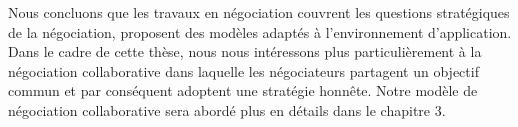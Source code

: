 		  
		Nous concluons que les travaux en négociation couvrent les questions stratégiques de la négociation, proposent des modèles adaptés à l'environnement d'application. Dans le cadre de cette thèse, nous nous intéressons plus particulièrement à la négociation collaborative dans laquelle les négociateurs partagent un objectif commun et par conséquent adoptent une stratégie honnête. Notre modèle de négociation collaborative sera abordé plus en détails dans le chapitre 3. 
		
		

	
	

